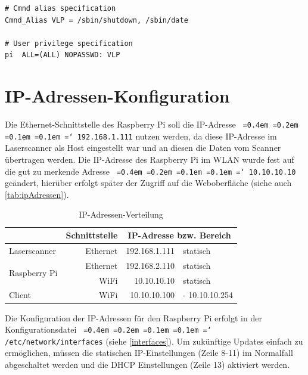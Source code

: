 \documentclass[a4paper,12pt,bibliography=totoc, listof=totoc,titlepage,pointlessnumbers]{scrreprt}
\newcommand*\justify{%
  \fontdimen2\font=0.4em%
  \fontdimen3\font=0.2em%
  \fontdimen4\font=0.1em%
  \fontdimen7\font=0.1em%
  \hyphenchar\font=`\-%
}
\newcommand{\code}[1]{\texttt{\justify{#1}}}
\begin{document}
\begin{lstlisting}[caption={Ergänzung der \code{/etc/sudoers}}, label={Lsudoers}]
# Cmnd alias specification
Cmnd_Alias VLP = /sbin/shutdown, /sbin/date

# User privilege specification
pi	ALL=(ALL) NOPASSWD: VLP
\end{lstlisting}

\section{IP-Adressen-Konfiguration}
Die Ethernet-Schnittstelle des Rasp\-berry Pi soll die IP-Adresse \code{192.168.1.111} nutzen werden, da diese IP-Adresse im Laser\-scan\-ner als Host eingestellt war und an diesen die Daten vom Scanner übertragen werden. Die IP-Adresse des Rasp\-berry Pi im WLAN wurde fest auf die gut zu merkende Adresse \code{10.10.10.10} geändert, hierüber erfolgt später der Zugriff auf die Weboberfläche (siehe auch \autoref{tab:ipAdressen}).

\begin{table}[!ht]
\centering
\begin{tabular}{l|r|r|l|}
\cline{2-4}
                                                    & Schnittstelle & \multicolumn{2}{c|}{IP-Adresse bzw. Bereich} \\ \hline
\multicolumn{1}{|l|}{Laser\-scan\-ner}                  & Ethernet      & 192.168.1.111        & statisch              \\ \hline
\multicolumn{1}{|l|}{\multirow{2}{*}{Rasp\-berry Pi}} & Ethernet      & 192.168.2.110        & statisch              \\ \cline{2-4} 
\multicolumn{1}{|l|}{}                              & WiFi          & 10.10.10.10          & statisch              \\ \hline
\multicolumn{1}{|l|}{Client}                        & WiFi          & 10.10.10.100         & - 10.10.10.254        \\ \hline
\end{tabular}
\caption{IP-Adressen-Verteilung}
\label{tab:ipAdressen}
\end{table}

Die Konfiguration der IP-Adressen für den Rasp\-berry Pi erfolgt in der Konfigurationsdatei \code{/etc/network/interfaces} (siehe \autoref{interfaces}). Um zukünftige Updates einfach zu ermöglichen, müssen die statischen IP-Einstellungen (Zeile 8-11) im Normalfall abgeschaltet werden und die DHCP Einstellungen (Zeile 13) aktiviert werden. \citep{accesspoint}
\end{document}
